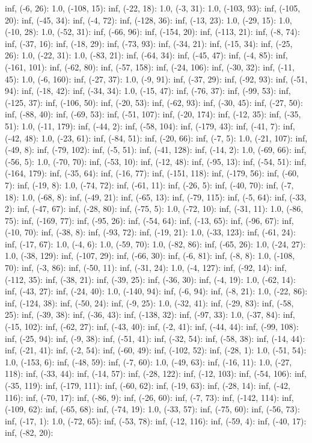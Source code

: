 \documentclass[parskip=half]{scrartcl}
\begin{document}
inf, (-6, 26): 1.0, (-108, 15): inf, (-22, 18): 1.0, (-3, 31): 1.0, (-103, 93): inf, (-105, 20): inf, (-45, 34): inf, (-4, 72): inf, (-128, 36): inf, (-13, 23): 1.0, (-29, 15): 1.0, (-10, 28): 1.0, (-52, 31): inf, (-66, 96): inf, (-154, 20): inf, (-113, 21): inf, (-8, 74): inf, (-37, 16): inf, (-18, 29): inf, (-73, 93): inf, (-34, 21): inf, (-15, 34): inf, (-25, 26): 1.0, (-22, 31): 1.0, (-83, 21): inf, (-64, 34): inf, (-45, 47): inf, (-4, 85): inf, (-161, 101): inf, (-62, 80): inf, (-57, 158): inf, (-24, 106): inf, (-30, 32): inf, (-11, 45): 1.0, (-6, 160): inf, (-27, 37): 1.0, (-9, 91): inf, (-37, 29): inf, (-92, 93): inf, (-51, 94): inf, (-18, 42): inf, (-34, 34): 1.0, (-15, 47): inf, (-76, 37): inf, (-99, 53): inf, (-125, 37): inf, (-106, 50): inf, (-20, 53): inf, (-62, 93): inf, (-30, 45): inf, (-27, 50): inf, (-88, 40): inf, (-69, 53): inf, (-51, 107): inf, (-20, 174): inf, (-12, 35): inf, (-35, 51): 1.0, (-11, 179): inf, (-44, 2): inf, (-58, 104): inf, (-179, 43): inf, (-41, 7): inf, (-42, 48): 1.0, (-23, 61): inf, (-84, 51): inf, (-20, 66): inf, (-7, 5): 1.0, (-21, 107): inf, (-49, 8): inf, (-79, 102): inf, (-5, 51): inf, (-41, 128): inf, (-14, 2): 1.0, (-69, 66): inf, (-56, 5): 1.0, (-70, 70): inf, (-53, 10): inf, (-12, 48): inf, (-95, 13): inf, (-54, 51): inf, (-164, 179): inf, (-35, 64): inf, (-16, 77): inf, (-151, 118): inf, (-179, 56): inf, (-60, 7): inf, (-19, 8): 1.0, (-74, 72): inf, (-61, 11): inf, (-26, 5): inf, (-40, 70): inf, (-7, 18): 1.0, (-68, 8): inf, (-49, 21): inf, (-65, 13): inf, (-79, 115): inf, (-5, 64): inf, (-33, 2): inf, (-47, 67): inf, (-28, 80): inf, (-75, 5): 1.0, (-72, 10): inf, (-31, 11): 1.0, (-86, 75): inf, (-169, 77): inf, (-95, 26): inf, (-54, 64): inf, (-13, 65): inf, (-96, 67): inf, (-10, 70): inf, (-38, 8): inf, (-93, 72): inf, (-19, 21): 1.0, (-33, 123): inf, (-61, 24): inf, (-17, 67): 1.0, (-4, 6): 1.0, (-59, 70): 1.0, (-82, 86): inf, (-65, 26): 1.0, (-24, 27): 1.0, (-38, 129): inf, (-107, 29): inf, (-66, 30): inf, (-6, 81): inf, (-8, 8): 1.0, (-108, 70): inf, (-3, 86): inf, (-50, 11): inf, (-31, 24): 1.0, (-4, 127): inf, (-92, 14): inf, (-112, 35): inf, (-38, 21): inf, (-39, 25): inf, (-36, 30): inf, (-4, 19): 1.0, (-62, 14): inf, (-43, 27): inf, (-24, 40): 1.0, (-140, 94): inf, (-6, 94): inf, (-8, 21): 1.0, (-22, 86): inf, (-124, 38): inf, (-50, 24): inf, (-9, 25): 1.0, (-32, 41): inf, (-29, 83): inf, (-58, 25): inf, (-39, 38): inf, (-36, 43): inf, (-138, 32): inf, (-97, 33): 1.0, (-37, 84): inf, (-15, 102): inf, (-62, 27): inf, (-43, 40): inf, (-2, 41): inf, (-44, 44): inf, (-99, 108): inf, (-25, 94): inf, (-9, 38): inf, (-51, 41): inf, (-32, 54): inf, (-58, 38): inf, (-14, 44): inf, (-21, 41): inf, (-2, 54): inf, (-60, 49): inf, (-102, 52): inf, (-28, 1): 1.0, (-51, 54): 1.0, (-153, 6): inf, (-48, 59): inf, (-7, 60): 1.0, (-49, 63): inf, (-16, 11): 1.0, (-27, 118): inf, (-33, 44): inf, (-14, 57): inf, (-28, 122): inf, (-12, 103): inf, (-54, 106): inf, (-35, 119): inf, (-179, 111): inf, (-60, 62): inf, (-19, 63): inf, (-28, 14): inf, (-42, 116): inf, (-70, 17): inf, (-86, 9): inf, (-26, 60): inf, (-7, 73): inf, (-142, 114): inf, (-109, 62): inf, (-65, 68): inf, (-74, 19): 1.0, (-33, 57): inf, (-75, 60): inf, (-56, 73): inf, (-17, 1): 1.0, (-72, 65): inf, (-53, 78): inf, (-12, 116): inf, (-59, 4): inf, (-40, 17): inf, (-82, 20): 
\end{document}
